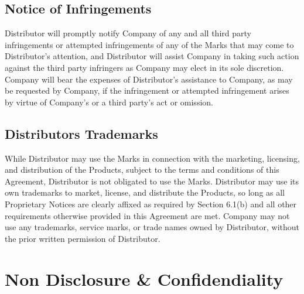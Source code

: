 \documentclass[letterpaper,10pt,english]{sphinxmanual}
\begin{document}
\section{Notice of Infringements}
\label{\detokenize{trademarks:notice-of-infringements}}
Distributor will promptly notify Company of any and all third party infringements or attempted infringements of any of the Marks that may come to Distributor’s attention, and Distributor will assist Company in taking such action against the third party infringers as Company may elect in its sole discretion. Company will bear the expenses of Distributor’s assistance to Company, as may be requested by Company, if the infringement or attempted infringement arises by virtue of Company’s or a third party’s act or omission.


\section{Distributors Trademarks}
\label{\detokenize{trademarks:distributors-trademarks}}
While Distributor may use the Marks in connection with the marketing, licensing, and distribution of the Products, subject to the terms and conditions of this Agreement, Distributor is not obligated to use the Marks. Distributor may use its own trademarks to market, license, and distribute the Products, so long as all Proprietary Notices are clearly affixed as required by Section 6.1(b) and all other requirements otherwise provided in this Agreement are met. Company may not use any trademarks, service marks, or trade names owned by Distributor, without the prior written permission of Distributor.


\chapter{Non Disclosure \& Confidendiality}
\label{\detokenize{nondisclosure:non-disclosure-confidendiality}}\label{\detokenize{nondisclosure::doc}}
\end{document}
